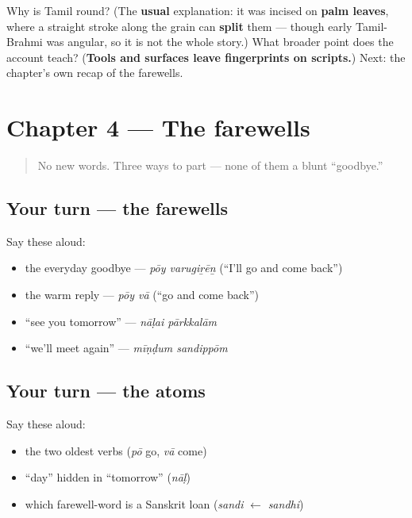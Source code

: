 \begin{tcolorbox}[breakable,colback=teal!4,colframe=teal!35!black,title={Before you move on}]
Why is Tamil round? (The \textbf{usual} explanation: it was incised on \textbf{palm leaves}, where a straight stroke along the grain can \textbf{split} them — though early Tamil-Brahmi was angular, so it is not the whole story.) What broader point does the account teach? (\textbf{Tools and surfaces leave fingerprints on scripts.}) Next: the chapter's own recap of the farewells.
\end{tcolorbox}
\section[Practice]{Chapter 4 — The farewells}

\label{lesson:TA-C04-practice}



\begin{quote}
No new words. Three ways to part — none of them a blunt \textquotedblleft{}goodbye.\textquotedblright{}
\end{quote}

\subsection*{Your turn — the farewells}
Say these aloud:

\begin{itemize}
\raggedright
  \item the everyday goodbye — \emph{pōy varugiṟēṉ} (\textquotedblleft{}I'll go and come back\textquotedblright{})
  \item the warm reply — \emph{pōy vā} (\textquotedblleft{}go and come back\textquotedblright{})
  \item \textquotedblleft{}see you tomorrow\textquotedblright{} — \emph{nāḷai pārkkalām}
  \item \textquotedblleft{}we'll meet again\textquotedblright{} — \emph{mīṇḍum sandippōm}
\end{itemize}

\subsection*{Your turn — the atoms}
Say these aloud:

\begin{itemize}
\raggedright
  \item the two oldest verbs (\emph{pō} go, \emph{vā} come)
  \item \textquotedblleft{}day\textquotedblright{} hidden in \textquotedblleft{}tomorrow\textquotedblright{} (\emph{nāḷ})
  \item which farewell-word is a Sanskrit loan (\emph{sandi} $\leftarrow$ \emph{sandhi})
\end{itemize}

